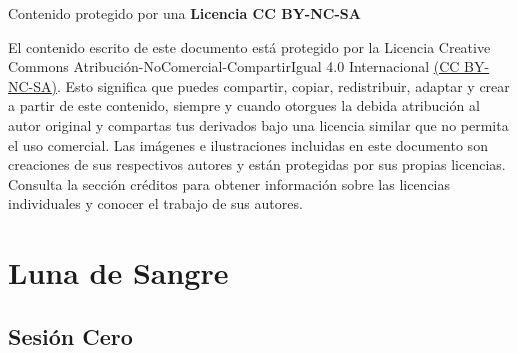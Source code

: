 \documentclass[10pt,twoside,twocolumn,openany]{dndbook}
\begin{document}
\begin{center}
  \vspace*{\fill} %
  \begin{minipage}[b]{\textwidth}
      \justifying %
      \noindent %
      \faCreativeCommons \faCreativeCommonsBy \faCreativeCommonsNc \faCreativeCommonsSa \hspace{0.5em} 
      Contenido protegido por una \textbf{Licencia CC BY-NC-SA}
      \vspace{1em} %

      {\footnotesize
      \noindent
      El contenido escrito de este documento está protegido por la Licencia Creative Commons 
      Atribución-NoComercial-CompartirIgual 4.0 Internacional 
      \href{https://creativecommons.org/licenses/by-nc-sa/4.0/deed.es}{(CC BY-NC-SA)}. Esto 
      significa que puedes compartir, copiar, redistribuir, adaptar y crear a partir de este 
      contenido, siempre y cuando otorgues la debida atribución al autor original y compartas tus 
      derivados bajo una licencia similar que no permita el uso comercial. Las imágenes e 
      ilustraciones incluidas en este documento son creaciones de sus respectivos autores y están 
      protegidas por sus propias licencias. Consulta la sección créditos para obtener información 
      sobre las licencias individuales y conocer el trabajo de sus autores.
      }
    \end{minipage}
\end{center}

\frontmatter

\maketitle

\tableofcontents

\mainmatter

\part*{Luna de Sangre}

\chapter*{Sesión Cero}
\end{document}
